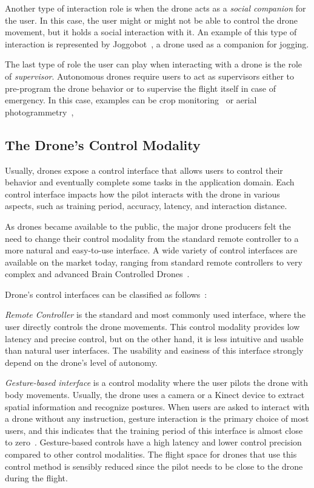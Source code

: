 Another type of interaction role is when the drone acts as a \textit{social companion} for the user. 
In this case, the user might or might not be able to control the drone movement, but it holds a social interaction with it.
An example of this type of interaction is represented by Joggobot~\cite{graether2012joggobot}, a drone used as a companion for jogging.

The last type of role the user can play when interacting with a drone is the role of \textit{supervisor}.
Autonomous drones require users to act as supervisors either to pre-program the drone behavior or to 
supervise the flight itself in case of emergency. In this case, examples can be crop monitoring~\cite{dantu2011karma} or aerial photogrammetry~\cite{nex2014uav3Dmapping}, 

\subsection{The Drone's Control Modality}\label{subsec:hdi_drone_control_mod}
Usually, drones expose a control interface that allows users to control their behavior and eventually complete some tasks in the application domain.
Each control interface impacts how the pilot interacts with the drone in various aspects, 
such as training period, accuracy, latency, and interaction distance.

As drones became available to the public, the major drone producers felt the need to change their control modality 
from the standard remote controller to a more natural and easy-to-use interface.
A wide variety of control interfaces are available on the market today, 
ranging from standard remote controllers to very complex and advanced Brain Controlled Drones~\cite{lafleur2013quadcopterBCI}.

Drone's control interfaces can be classified as follows~\cite{tezza2019hdi}:

\textit{Remote Controller} is the standard and most commonly used interface, where the user directly controls the drone movements.
This control modality provides low latency and precise control, but on the other hand, it is less intuitive and usable 
than natural user interfaces. The usability and easiness of this interface strongly depend on the drone's level of autonomy.

\textit{Gesture-based interface} is a control modality where the user pilots the drone with body movements.
Usually, the drone uses a camera or a Kinect device to extract spatial information and recognize postures. 
When users are asked to interact with a drone without any instruction, gesture interaction is the primary choice of most users, 
and this indicates that the training period of this interface is almost close to zero~\cite{cauchard2015droneAndMe}. 
Gesture-based controls have a high latency and lower control precision compared to other control modalities. 
The flight space for drones that use this control method is sensibly reduced since the pilot needs to be close to the drone during the flight.

